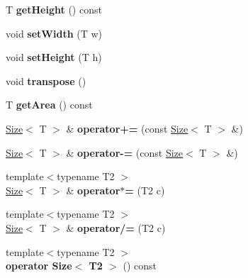 \begin{DoxyCompactItemize}
\item 
\hypertarget{class_size_aaca336454ac27a1359a7f815da660ab4}{
T {\bfseries getHeight} () const }
\label{class_size_aaca336454ac27a1359a7f815da660ab4}

\item 
\hypertarget{class_size_a121262181e42aa1ca35b87eb072230fc}{
void {\bfseries setWidth} (T w)}
\label{class_size_a121262181e42aa1ca35b87eb072230fc}

\item 
\hypertarget{class_size_a31c905c24fc46fd7fb0ead3b27c883bf}{
void {\bfseries setHeight} (T h)}
\label{class_size_a31c905c24fc46fd7fb0ead3b27c883bf}

\item 
\hypertarget{class_size_ad4fe5e5347033c30961bf0bb68e2f2db}{
void {\bfseries transpose} ()}
\label{class_size_ad4fe5e5347033c30961bf0bb68e2f2db}

\item 
\hypertarget{class_size_adb5d429e93a45a4711a34a1b1b5d979f}{
T {\bfseries getArea} () const }
\label{class_size_adb5d429e93a45a4711a34a1b1b5d979f}

\item 
\hypertarget{class_size_a0ce6047fd3c0a883acd287b5b34d083b}{
\hyperlink{class_size}{Size}$<$ T $>$ \& {\bfseries operator+=} (const \hyperlink{class_size}{Size}$<$ T $>$ \&)}
\label{class_size_a0ce6047fd3c0a883acd287b5b34d083b}

\item 
\hypertarget{class_size_a9f6d6f2e34d1d3ff3c288bb25e08ad8f}{
\hyperlink{class_size}{Size}$<$ T $>$ \& {\bfseries operator-\/=} (const \hyperlink{class_size}{Size}$<$ T $>$ \&)}
\label{class_size_a9f6d6f2e34d1d3ff3c288bb25e08ad8f}

\item 
\hypertarget{class_size_aab38c063fa04e4f22cfccab0f6417433}{
{\footnotesize template$<$typename T2 $>$ }\\\hyperlink{class_size}{Size}$<$ T $>$ \& {\bfseries operator$\ast$=} (T2 c)}
\label{class_size_aab38c063fa04e4f22cfccab0f6417433}

\item 
\hypertarget{class_size_ae23ef0c1e3fc6bd7054d6553fb6e8a00}{
{\footnotesize template$<$typename T2 $>$ }\\\hyperlink{class_size}{Size}$<$ T $>$ \& {\bfseries operator/=} (T2 c)}
\label{class_size_ae23ef0c1e3fc6bd7054d6553fb6e8a00}

\item 
\hypertarget{class_size_ae7c404e21e544f5e95a194a03c84f251}{
{\footnotesize template$<$typename T2 $>$ }\\{\bfseries operator Size$<$ T2 $>$} () const }
\label{class_size_ae7c404e21e544f5e95a194a03c84f251}

\end{DoxyCompactItemize}


